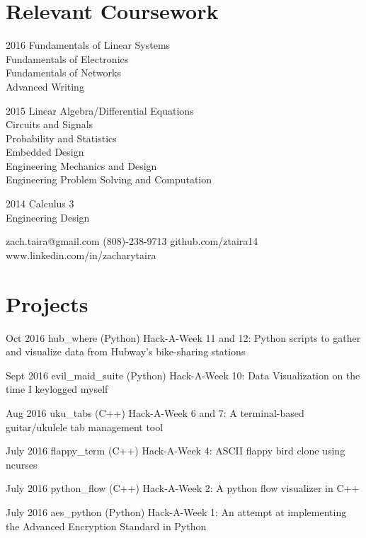 \documentclass{tccv}
\begin{document}
\section{Relevant Coursework}
\begin{factlist}
\item{2016}
    {Fundamentals of Linear Systems\\
    Fundamentals of Electronics\\
    Fundamentals of Networks\\
    Advanced Writing}
\item{2015}
    {Linear Algebra/Differential Equations\\
    Circuits and Signals\\
    Probability and Statistics\\
    Embedded Design\\
    Engineering Mechanics and Design\\
    Engineering Problem Solving and Computation}
\item{2014}
    {Calculus 3\\
    Engineering Design}
\end{factlist}

\personal
    {zach.taira@gmail.com}
    {(808)-238-9713}
    {github.com/ztaira14}
    {www.linkedin.com/in/zacharytaira}

\section{Projects}

\begin{yearlist}

\item{Oct 2016}
    {hub\_where (Python)}
    {Hack-A-Week 11 and 12: Python scripts to gather and visualize data
from Hubway's bike-sharing stations}

\item{Sept 2016}
    {evil\_maid\_suite (Python)}
    {Hack-A-Week 10: Data Visualization on the time I keylogged myself}

\item{Aug 2016}
    {uku\_tabs (C++)}
    {Hack-A-Week 6 and 7: A terminal-based guitar/ukulele tab management tool}

\item{July 2016}
    {flappy\_term (C++)}
    {Hack-A-Week 4: ASCII flappy bird clone using ncurses}

\item{July 2016}
    {python\_flow (C++)}
    {Hack-A-Week 2: A python flow visualizer in C++}

\item{July 2016}
    {aes\_python (Python)}
    {Hack-A-Week 1: An attempt at implementing the Advanced Encryption
    Standard in Python}

\end{yearlist}
\end{document}
